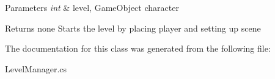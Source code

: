 \begin{DoxyParams}{Parameters}
{\em int} & level, Game\+Object character \\
\hline
\end{DoxyParams}
\begin{DoxyReturn}{Returns}
none Starts the level by placing player and setting up scene 
\end{DoxyReturn}


The documentation for this class was generated from the following file\+:\begin{DoxyCompactItemize}
\item 
Level\+Manager.\+cs\end{DoxyCompactItemize}
